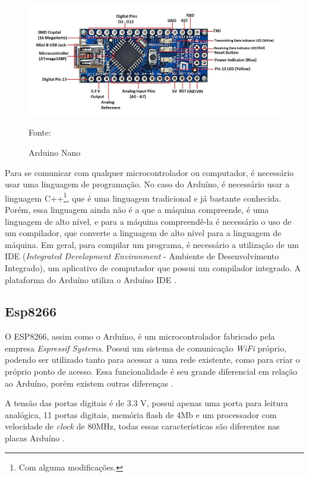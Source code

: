 \begin{figure}[h]
	\centering
	\includegraphics[keepaspectratio=true,scale=0.7
	]{figuras/arduino_nano.png}
	\caption{ Arduino Nano }
	Fonte: \cite{john2018}
	\label{arduino}	
\end{figure}

Para se comunicar com qualquer microcontrolador ou computador, é necessário usar uma linguagem de programação. No caso do Arduíno, é necessário usar a linguagem C++\footnote{Com alguma modificações.}, que é uma linguagem tradicional e já bastante conhecida. Porém, essa linguagem ainda não é a que a máquina compreende, é uma linguagem de alto nível, e para a máquina compreendê-la é necessário o uso de um compilador, que converte a linguagem de alto nível para a linguagem de máquina. Em geral, para compilar um programa, é necessário a utilização de um IDE (\textit{Integrated Development Environment} - Ambiente de Desenvolvimento Integrado), um aplicativo de computador que possui um compilador integrado. A plataforma do Arduíno utiliza o Arduíno IDE \cite{chavier2016}. 

\subsection{Esp8266}

O ESP8266, assim como o Arduíno, é  um microcontrolador  fabricado pela empresa \textit{Espressif Systems}. Possui um sistema de comunicação \textit{WiFi }próprio, podendo ser utilizado tanto para acessar a uma rede existente, como para criar o próprio ponto de acesso.  Essa funcionalidade é seu grande diferencial em relação ao Arduíno, porém existem outras diferenças \cite{oliveira2017}. 

A tensão das portas digitais é de 3.3 V, possui apenas uma porta para leitura analógica, 11 portas digitais, memória flash de 4Mb e um processador com velocidade de \textit{clock} de 80MHz, todas essas características são diferentes nas placas Arduíno \cite{wemos2017}.

